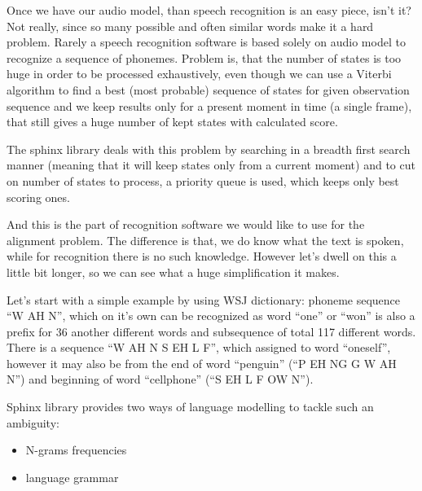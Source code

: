 \documentclass[12pt,a4paper,english]{article}
\begin{document}
\newpage

Once we have our audio model, than speech recognition is an easy piece, isn't it? \newline
Not really, since so many possible and often similar words make it a hard problem. Rarely a speech recognition software is based solely on audio model to recognize a sequence of phonemes. \newline
Problem is, that the number of states is too huge in order to be processed exhaustively, even though we can use a Viterbi algorithm to find a best (most probable) sequence of states for given observation sequence and we keep results only for a present moment in time (a single frame), that still gives a huge number
of kept states with calculated score. \newline

The sphinx library deals with this problem by searching in a breadth first search manner (meaning that it will keep states only from a current moment) and to cut on number of states to process, a priority queue is used, which keeps only best scoring ones. \newline

And this is the part of recognition software we would like to use for the alignment problem. \newline
The difference is that, we do know what the text is spoken, while for recognition there is no such knowledge. \newline
However let's dwell on this a little bit longer, so we can see what a huge simplification it makes. \newline

Let's start with a simple example by using WSJ dictionary: \newline
phoneme sequence “W AH N”, which  on it's own can be recognized as word “one” or “won” is also a prefix for 36 another different words and subsequence of total 117 different words. \newline
There is a sequence “W AH N S EH L F”, which assigned to word “oneself”, however it may also be from the end of word “penguin” (“P EH NG G W AH N”) and beginning of word “cellphone” (“S EH L F OW N”). \newline

Sphinx library provides two ways of language modelling to tackle such an ambiguity:
\begin{itemize}
    \item N-grams frequencies
    \item language grammar
\end{itemize}
\end{document}
